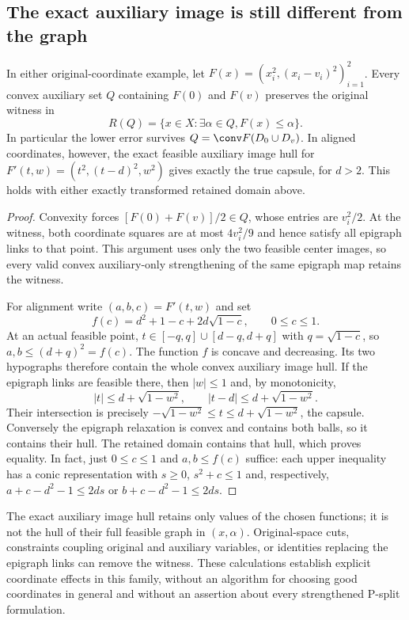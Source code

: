 \subsection{The exact auxiliary image is still different from the graph}
\begin{proposition}
\label{prop:psplit-exact-image}
In either original-coordinate example, let
$F(x)=(x_i^2,(x_i-v_i)^2)_{i=1}^2$. Every convex auxiliary set $Q$
containing $F(0)$ and $F(v)$ preserves the original witness in
\[
 R(Q)=\{x\in X:\exists\alpha\in Q,F(x)\le\alpha\}.
\]
In particular the lower error survives $Q=\conv F(D_0\cup D_v)$.
In aligned coordinates, however, the exact feasible auxiliary image hull
for $F'(t,w)=(t^2,(t-d)^2,w^2)$ gives exactly the true capsule, for $d>2$.
This holds with either exactly transformed retained domain above.
\end{proposition}
\begin{proof}
Convexity forces $[F(0)+F(v)]/2\in Q$, whose entries are $v_i^2/2$.
At the witness, both coordinate squares are at most $4v_i^2/9$ and
hence satisfy all epigraph links to that point. This argument uses only
the two feasible center images, so every valid convex auxiliary-only
strengthening of the same epigraph map retains the witness.

For alignment write $(a,b,c)=F'(t,w)$ and set
\[
 f(c)=d^2+1-c+2d\sqrt{1-c},\qquad0\le c\le1.
\]
At an actual feasible point, $t\in[-q,q]\cup[d-q,d+q]$ with
$q=\sqrt{1-c}$, so $a,b\le(d+q)^2=f(c)$. The function $f$ is
concave and decreasing. Its two hypographs therefore contain the whole
convex auxiliary image hull. If the epigraph links are feasible there,
then $|w|\le1$ and, by monotonicity,
\[
 |t|\le d+\sqrt{1-w^2},\qquad |t-d|\le d+\sqrt{1-w^2}.
\]
Their intersection is precisely
$-\sqrt{1-w^2}\le t\le d+\sqrt{1-w^2}$, the capsule.
Conversely the epigraph relaxation is convex and contains both balls,
so it contains their hull. The retained domain contains that hull,
which proves equality. In fact, just $0\le c\le1$ and $a,b\le f(c)$
suffice: each upper inequality has a conic representation with
$s\ge0$, $s^2+c\le1$ and, respectively,
$a+c-d^2-1\le2ds$ or $b+c-d^2-1\le2ds$.
\end{proof}
The exact auxiliary image hull retains only values of the chosen functions;
it is not the hull of their full feasible graph in $(x,\alpha)$.
Original-space cuts, constraints coupling original and auxiliary variables,
or identities replacing the epigraph links can remove the witness.
These calculations establish explicit coordinate effects in this family,
without an algorithm for choosing good coordinates in general and without
an assertion about every strengthened P-split formulation.

